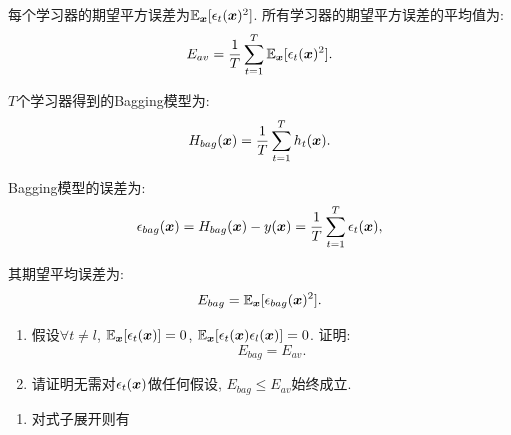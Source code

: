 \documentclass[answers]{exam}  %
\begin{document}
\begin{questions}
  每个学习器的期望平方误差为$\mathbb{E}_{{\boldsymbol{x}}}[\epsilon_t({\boldsymbol{x}})^2]$. 所有学习器的期望平方误差的平均值为:
  \begin{equation}
    E_{av}=\frac{1}{T}\sum_{t=1}^T \mathbb{E}_{{\boldsymbol{x}}}[\epsilon_t({\boldsymbol{x}})^2].
  \end{equation}

  $T$个学习器得到的Bagging模型为:
  \begin{equation}
    H_{bag}({\boldsymbol{x}})=\frac{1}{T}\sum_{t=1}^T h_t({\boldsymbol{x}}).
  \end{equation}

  Bagging模型的误差为:
  \begin{equation}
    \epsilon_{bag}({\boldsymbol{x}})=H_{bag}({\boldsymbol{x}})-y({\boldsymbol{x}})=\frac{1}{T}\sum_{t=1}^T \epsilon_t({\boldsymbol{x}}),
  \end{equation}

  其期望平均误差为:
  \begin{equation}
    E_{bag}=\mathbb{E}_{{\boldsymbol{x}}}[\epsilon_{bag}({\boldsymbol{x}})^2].
  \end{equation}

  \begin{enumerate}
    \item 假设$\forall t\neq l$, $\mathbb{E}_{{\boldsymbol{x}}}[\epsilon_t({\boldsymbol{x}})]=0$, $ \mathbb{E}_{{\boldsymbol{x}}}[\epsilon_t({\boldsymbol{x}})\epsilon_l({\boldsymbol{x}})]=0$. 证明:
          \begin{equation}
            E_{bag}=E_{av}.
          \end{equation}

    \item 请证明无需对$\epsilon_t({\boldsymbol{x}})$做任何假设, $E_{bag}\leq E_{av}$始终成立.
  \end{enumerate}

  \begin{solution}
    \begin{enumerate}
      \item

            对式子展开则有


\end{enumerate}
\end{solution}
\end{questions}
\end{document}
